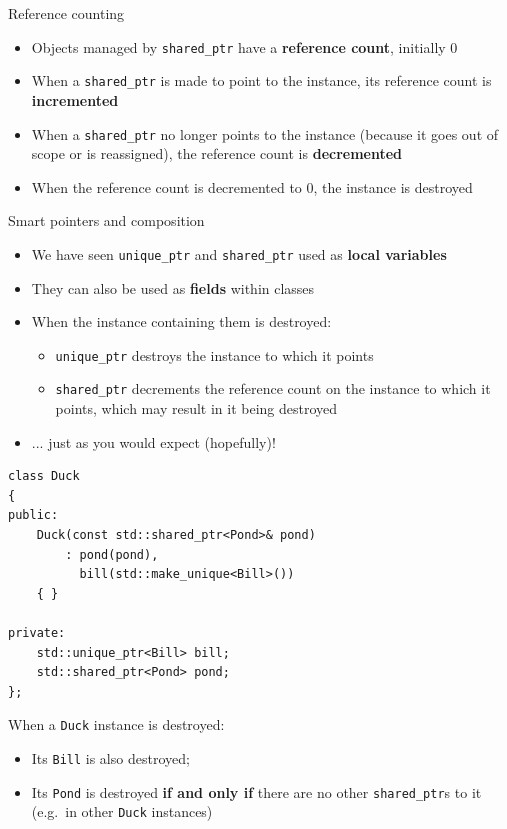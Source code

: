 \begin{frame}{Reference counting}
    \begin{itemize}
        \item Objects managed by \lstinline{shared_ptr} have a \textbf{reference count}, initially 0 \pause
        \item When a \lstinline{shared_ptr} is made to point to the instance,
            its reference count is \textbf{incremented} \pause
        \item When a \lstinline{shared_ptr} no longer points to the instance
            (because it goes out of scope or is reassigned),
            the reference count is \textbf{decremented} \pause
        \item When the reference count is decremented to 0,
            the instance is destroyed
    \end{itemize}
\end{frame}

\begin{frame}{Smart pointers and composition}
    \begin{itemize}
        \item We have seen \lstinline{unique_ptr} and \lstinline{shared_ptr} used as
            \textbf{local variables} \pause
        \item They can also be used as \textbf{fields} within classes \pause
        \item When the instance containing them is destroyed: \pause
            \begin{itemize}
                \item \lstinline{unique_ptr} destroys the instance to which it points \pause
                \item \lstinline{shared_ptr} decrements the reference count on the instance 
                    to which it points, which may result in it being destroyed \pause
            \end{itemize}
        \item ... just as you would expect (hopefully)!
    \end{itemize}
\end{frame}

\begin{frame}[fragile]
    \begin{lstlisting}
class Duck
{
public:
    Duck(const std::shared_ptr<Pond>& pond)
        : pond(pond),
          bill(std::make_unique<Bill>())
    { }
    
private:
    std::unique_ptr<Bill> bill;
    std::shared_ptr<Pond> pond;
};
    \end{lstlisting} \pause
    When a \lstinline{Duck} instance is destroyed: \pause
    \begin{itemize}
        \item Its \lstinline{Bill} is also destroyed; \pause
        \item Its \lstinline{Pond} is destroyed \textbf{if and only if} there are no other
            \lstinline{shared_ptr}s to it (e.g.\ in other \lstinline{Duck} instances)
    \end{itemize}
\end{frame}


